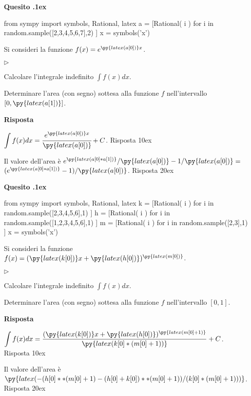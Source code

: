 \documentclass[11pt,twoside,a4paper]{article}
\newcommand{\mylabel}[1]{#1\hfill}
\renewenvironment{itemize}
  {\begin{list}{$\triangleright$}{%
   \setlength{\parskip}{0mm}
   \setlength{\topsep}{.4\baselineskip}
   \setlength{\rightmargin}{0mm}
   \setlength{\listparindent}{0mm}
   \setlength{\itemindent}{0mm}
   \setlength{\labelwidth}{2ex}
   \setlength{\itemsep}{.4\baselineskip}
   \setlength{\parsep}{0mm}
   \setlength{\partopsep}{0mm}
   \setlength{\labelsep}{1ex}
   \setlength{\leftmargin}{\labelwidth+\labelsep}
   \let\makelabel\mylabel}}{%
   \end{list}\vspace*{-1.3mm}}
\newcounter{quesito}
\newenvironment{question}{\bigskip\addtocounter{quesito}{1}\bigskip\bigskip\par\textbf{Quesito \thequesito.\kern1ex}}{\vspace{\parskip}}
\newenvironment{answer}{\par\textbf{Risposta\quad}}{\vspace{\parskip}}
\begin{document}
\begin{question}
\begin{pycode}
from sympy import symbols, Rational, latex
a = [Rational( i ) for i in random.sample([2,3,4,5,6,7],2) ]
x = symbols('x')
\end{pycode}
Si consideri la funzione $f(x) = e^{\py{latex(a[0])}x}$.
\begin{itemize}
\item[1.] Calcolare l'integrale indefinito $\displaystyle \int f(x) dx$.
\item[2.] Determinare l'area (con segno) sottesa alla funzione $f$ nell'intervallo $[0,\py{latex(a[1])}]$.
\end{itemize}
\begin{answer}

{\color{blue}
$\displaystyle \int f(x) dx = \cfrac{e^{\py{latex(a[0])}x}}{\py{latex(a[0])}} + C$.
\hfill Risposta 1\kern0ex}


\medskip
{\color{blue} Il valore dell'area è} $e^{\py{latex(a[0]*a[1])}}/\py{latex(a[0])} - 1/\py{latex(a[0])}=$ {\color{blue}$(e^{\py{latex(a[0]*a[1])}}-1)/\py{latex(a[0])}$.
\hfill Risposta 2\kern0ex}

\end{answer}
\end{question}
\begin{question}
\begin{pycode}
from sympy import symbols, Rational, latex
k = [Rational( i ) for i in random.sample([2,3,4,5,6],1) ]
h = [Rational( i ) for i in random.sample([1,2,3,4,5,6],1) ]
m = [Rational( i ) for i in random.sample([2,3],1) ]
x = symbols('x')
\end{pycode}
Si consideri la funzione $f(x) = (\py{latex(k[0])}x+\py{latex(h[0])})^{\py{latex(m[0])}}$.
\begin{itemize}
\item[1.] Calcolare l'integrale indefinito $\displaystyle \int f(x) dx$.
\item[2.] Determinare l'area (con segno) sottesa alla funzione $f$ nell'intervallo $[0,1]$.
\end{itemize}
\begin{answer}

{\color{blue}
$\displaystyle \int f(x) dx = \dfrac{(\py{latex(k[0])}x+\py{latex(h[0])})^{\py{latex(m[0]+1)}}}{\py{latex(k[0]*(m[0]+1))}} + C$.
\hfill Risposta 1\kern0ex}


\medskip
{\color{blue} Il valore dell'area è $\py{latex(-(h[0]**(m[0]+1)-(h[0]+k[0])**(m[0]+1))/(k[0]*(m[0]+1)))}$.
\hfill Risposta 2\kern0ex}

\end{answer}
\end{question}
\end{document}
